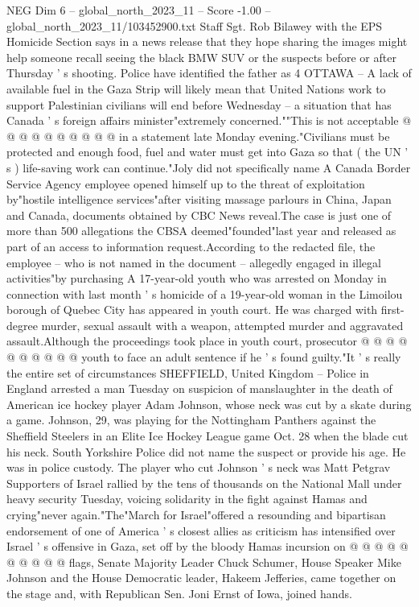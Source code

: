 \begin{textsample}{NEG Dim 6 – global\_north\_2023\_11 – Score -1.00 – global\_north\_2023\_11/103452900.txt}
Staff Sgt.
Rob Bilawey with the EPS Homicide Section says in a news release that they hope sharing the images might help someone recall seeing the black BMW SUV or the suspects before or after Thursday ' s shooting.
Police have identified the father as 4 OTTAWA -- A lack of available fuel in the Gaza Strip will likely mean that United Nations work to support Palestinian civilians will end before Wednesday -- a situation that has Canada ' s foreign affairs minister"extremely concerned.""This is not acceptable @ @ @ @ @ @ @ @ @ @ in a statement late Monday evening."Civilians must be protected and enough food, fuel and water must get into Gaza so that ( the UN ' s ) life-saving work can continue."Joly did not specifically name A Canada Border Service Agency employee opened himself up to the threat of exploitation by"hostile intelligence services"after visiting massage parlours in China, Japan and Canada, documents obtained by CBC News reveal.The case is just one of more than 500 allegations the CBSA deemed"founded"last year and released as part of an access to information request.According to the redacted file, the employee -- who is not named in the document -- allegedly engaged in illegal activities"by purchasing A 17-year-old youth who was arrested on Monday in connection with last month ' s homicide of a 19-year-old woman in the Limoilou borough of Quebec City has appeared in youth court.
He was charged with first-degree murder, sexual assault with a weapon, attempted murder and aggravated assault.Although the proceedings took place in youth court, prosecutor @ @ @ @ @ @ @ @ @ @ youth to face an adult sentence if he ' s found guilty."It ' s really the entire set of circumstances SHEFFIELD, United Kingdom -- Police in England arrested a man Tuesday on suspicion of manslaughter in the death of American ice hockey player Adam Johnson, whose neck was cut by a skate during a game.
Johnson, 29, was playing for the Nottingham Panthers against the Sheffield Steelers in an Elite Ice Hockey League game Oct. 28 when the blade cut his neck.
South Yorkshire Police did not name the suspect or provide his age.
He was in police custody.
The player who cut Johnson ' s neck was Matt Petgrav Supporters of Israel rallied by the tens of thousands on the National Mall under heavy security Tuesday, voicing solidarity in the fight against Hamas and crying"never again."The"March for Israel"offered a resounding and bipartisan endorsement of one of America ' s closest allies as criticism has intensified over Israel ' s offensive in Gaza, set off by the bloody Hamas incursion on @ @ @ @ @ @ @ @ @ @ flags, Senate Majority Leader Chuck Schumer, House Speaker Mike Johnson and the House Democratic leader, Hakeem Jefferies, came together on the stage and, with Republican Sen.
Joni Ernst of Iowa, joined hands.

\end{textsample}
